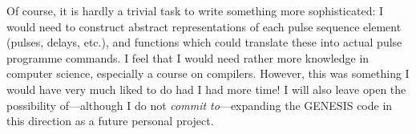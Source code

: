 Of course, it is hardly a trivial task to write something more sophisticated: I would need to construct abstract representations of each pulse sequence element (pulses, delays, etc.), and functions which could translate these into actual pulse programme commands.
I feel that I would need rather more knowledge in computer science, especially a course on compilers.
However, this was something I would have very much liked to do had I had more time!
I will also leave open the possibility of---although I do not \textit{commit to}---expanding the GENESIS code in this direction as a future personal project.
